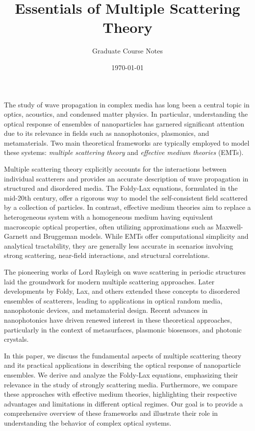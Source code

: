 \documentclass{article}
\begin{document}
\title{Essentials of Multiple Scattering Theory}
\author{Graduate Course Notes}
\date{\today}
\maketitle

The study of wave propagation in complex media has long been a central topic in optics, acoustics, and condensed matter physics. In particular, understanding the optical response of ensembles of nanoparticles has garnered significant attention due to its relevance in fields such as nanophotonics, plasmonics, and metamaterials. Two main theoretical frameworks are typically employed to model these systems: \textit{multiple scattering theory} and \textit{effective medium theories} (EMTs).

Multiple scattering theory explicitly accounts for the interactions between individual scatterers and provides an accurate description of wave propagation in structured and disordered media. The Foldy-Lax equations, formulated in the mid-20th century, offer a rigorous way to model the self-consistent field scattered by a collection of particles. In contrast, effective medium theories aim to replace a heterogeneous system with a homogeneous medium having equivalent macroscopic optical properties, often utilizing approximations such as Maxwell-Garnett and Bruggeman models. While EMTs offer computational simplicity and analytical tractability, they are generally less accurate in scenarios involving strong scattering, near-field interactions, and structural correlations.

The pioneering works of Lord Rayleigh on wave scattering in periodic structures laid the groundwork for modern multiple scattering approaches. Later developments by Foldy, Lax, and others extended these concepts to disordered ensembles of scatterers, leading to applications in optical random media, nanophotonic devices, and metamaterial design. Recent advances in nanophotonics have driven renewed interest in these theoretical approaches, particularly in the context of metasurfaces, plasmonic biosensors, and photonic crystals.

In this paper, we discuss the fundamental aspects of multiple scattering theory and its practical applications in describing the optical response of nanoparticle ensembles. We derive and analyze the Foldy-Lax equations, emphasizing their relevance in the study of strongly scattering media. Furthermore, we compare these approaches with effective medium theories, highlighting their respective advantages and limitations in different optical regimes. Our goal is to provide a comprehensive overview of these frameworks and illustrate their role in understanding the behavior of complex optical systems.
\end{document}
